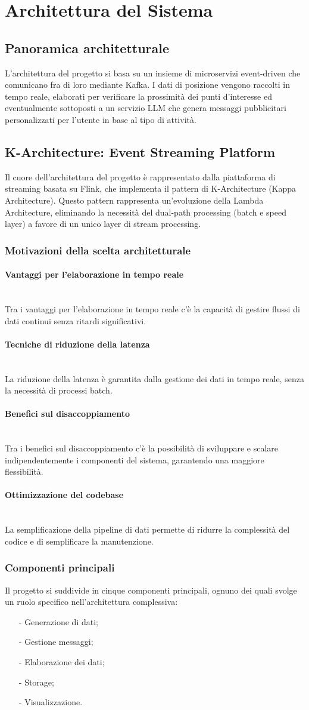 \documentclass[10pt]{article}
\newcommand{\myparagraph}[1]{\paragraph{#1}\mbox{}\\}
\begin{document}
\section{Architettura del Sistema}

\subsection{Panoramica architetturale}
L'architettura del progetto si basa su un insieme di microservizi event-driven che comunicano fra di loro mediante Kafka. I dati di posizione vengono raccolti in tempo reale, elaborati per verificare la prossimità dei punti d'interesse ed eventualmente sottoposti a un servizio LLM che genera messaggi pubblicitari personalizzati per l'utente in base al tipo di attività.

\subsection{K-Architecture: Event Streaming Platform}
Il cuore dell'architettura del progetto è rappresentato dalla piattaforma di streaming basata su Flink, che implementa il pattern di K-Architecture (Kappa Architecture). Questo pattern rappresenta un'evoluzione della Lambda Architecture, eliminando la necessità del dual-path processing (batch e speed layer) a favore di un unico layer di stream processing.
    \subsubsection{Motivazioni della scelta architetturale}
        \myparagraph{Vantaggi per l'elaborazione in tempo reale}
        Tra i vantaggi per l'elaborazione in tempo reale c'è la capacità di gestire flussi di dati continui senza ritardi significativi.
        \myparagraph{Tecniche di riduzione della latenza}
        La riduzione della latenza è garantita dalla gestione dei dati in tempo reale, senza la necessità di processi batch.
        \myparagraph{Benefici sul disaccoppiamento}
        Tra i benefici sul disaccoppiamento c'è la possibilità di sviluppare e scalare indipendentemente i componenti del sistema, garantendo una maggiore flessibilità.
        \myparagraph{Ottimizzazione del codebase}
        La semplificazione della pipeline di dati permette di ridurre la complessità del codice e di semplificare la manutenzione.

\subsubsection{Componenti principali}
Il progetto si suddivide in cinque componenti principali, ognuno dei quali svolge un ruolo specifico nell'architettura complessiva:
\begin{itemize}
    \item[-] Generazione di dati;
    \item[-] Gestione messaggi;
    \item[-] Elaborazione dei dati;
    \item[-] Storage;
    \item[-] Visualizzazione.
\end{itemize}
\end{document}
